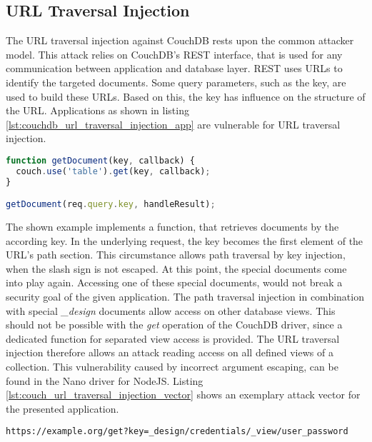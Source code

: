 \subsection{URL Traversal Injection}
The URL traversal injection against CouchDB rests upon the common attacker model. This attack relies on CouchDB's REST interface, that is used for any communication between application and database layer. REST uses URLs to identify the targeted documents. Some query parameters, such as the key, are used to build these URLs. Based on this, the key has influence on the structure of the URL. Applications as shown in listing \ref{lst:couchdb_url_traversal_injection_app} are vulnerable for URL traversal injection. \\

\begin{lstlisting}[caption={Vulnerable NodeJS example for URL traversal injection on CouchDB}, label={lst:couchdb_url_traversal_injection_app}, language=JavaScript]
function getDocument(key, callback) {
  couch.use('table').get(key, callback);
}

getDocument(req.query.key, handleResult);
\end{lstlisting}

The shown example implements a function, that retrieves documents by the according key. In the underlying request, the key becomes the first element of the URL's path section. This circumstance allows path traversal by key injection, when the slash sign is not escaped. At this point, the special documents come into play again. Accessing one of these special documents, would not break a security goal of the given application. The path traversal injection in combination with special \emph{\_design} documents allow access on other database views. This should not be possible with the \emph{get} operation of the CouchDB driver, since a dedicated function for separated view access is provided. The URL traversal injection therefore allows an attack reading access on all defined views of a collection. This vulnerability caused by incorrect argument escaping, can be found in the Nano driver for NodeJS. Listing \ref{lst:couch_url_traversal_injection_vector} shows an exemplary attack vector for the presented application. \\


\begin{lstlisting}[caption={Attack vector on CouchDB for URL traversal injection via the query-string parameter}, label={lst:couch_url_traversal_injection_vector}]
https://example.org/get?key=_design/credentials/_view/user_password
\end{lstlisting}

